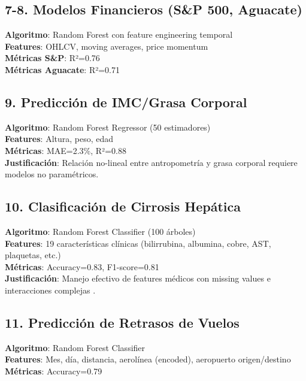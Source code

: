 \subsection{7-8. Modelos Financieros (S\&P 500, Aguacate)}

\textbf{Algoritmo}: Random Forest con feature engineering temporal \\
\textbf{Features}: OHLCV, moving averages, price momentum \\
\textbf{Métricas S\&P}: R²=0.76 \\
\textbf{Métricas Aguacate}: R²=0.71 \\

\subsection{9. Predicción de IMC/Grasa Corporal}

\textbf{Algoritmo}: Random Forest Regressor (50 estimadores) \\
\textbf{Features}: Altura, peso, edad \\
\textbf{Métricas}: MAE=2.3\%, R²=0.88 \\
\textbf{Justificación}: Relación no-lineal entre antropometría y grasa corporal requiere modelos no paramétricos.

\subsection{10. Clasificación de Cirrosis Hepática}

\textbf{Algoritmo}: Random Forest Classifier (100 árboles) \\
\textbf{Features}: 19 características clínicas (bilirrubina, albumina, cobre, AST, plaquetas, etc.) \\
\textbf{Métricas}: Accuracy=0.83, F1-score=0.81 \\
\textbf{Justificación}: Manejo efectivo de features médicos con missing values e interacciones complejas .

\subsection{11. Predicción de Retrasos de Vuelos}

\textbf{Algoritmo}: Random Forest Classifier \\
\textbf{Features}: Mes, día, distancia, aerolínea (encoded), aeropuerto origen/destino \\
\textbf{Métricas}: Accuracy=0.79 \\

